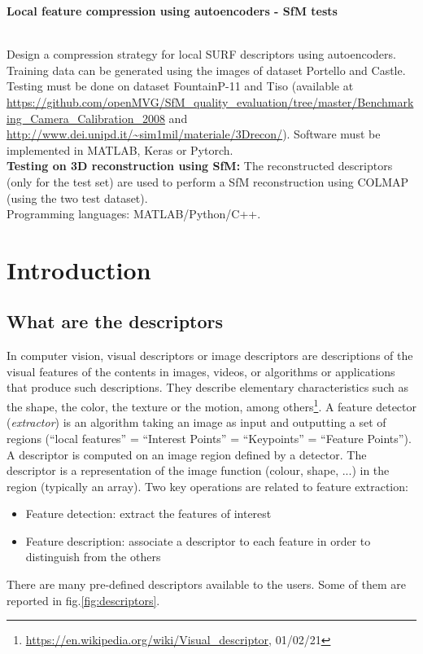 
{\raggedright\large\textbf{Local feature compression using autoencoders - SfM tests}}\smallskip \\ 
Design a compression strategy for local SURF descriptors using autoencoders. Training data can be generated using the images of dataset Portello and Castle. Testing must be done on dataset FountainP-11 and Tiso (available at \url{https://github.com/openMVG/SfM_quality_evaluation/tree/master/Benchmarking_Camera_Calibration_2008} and \url{http://www.dei.unipd.it/~sim1mil/materiale/3Drecon/}). Software must be implemented in MATLAB, Keras or Pytorch. \\ \textbf{Testing on 3D reconstruction using SfM:} The reconstructed descriptors (only for the test set) are used to perform a SfM reconstruction using COLMAP (using the two test dataset). \\
Programming languages: MATLAB/Python/C++.

\section{Introduction}

\subsection{What are the descriptors}
In computer vision, visual descriptors or image descriptors are descriptions of the visual features of the contents in images, videos, or algorithms or applications that produce such descriptions. They describe elementary characteristics such as the shape, the color, the texture or the motion, among others\footnote{\url{https://en.wikipedia.org/wiki/Visual_descriptor}, 01/02/21}. A feature detector (\emph{extractor}) is an algorithm taking an image as input and outputting a set of regions (``local features'' = ``Interest Points'' = ``Keypoints'' = ``Feature Points''). A descriptor is computed on an image region defined by a detector. The descriptor is a representation of the image function (colour, shape, ...) in the region (typically an array). Two key operations are related to feature extraction:
\begin{itemize}
\item Feature detection: extract the features of interest
\item Feature description: associate a descriptor to each feature in order to distinguish from the others
\end{itemize}
There are many pre-defined descriptors available to the users. Some of them are reported in fig.\ref{fig:descriptors}.

